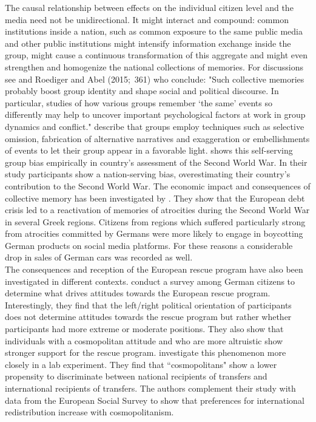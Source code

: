 The causal relationship between effects on the individual citizen level and
the media need not be unidirectional. It might interact and compound: common
institutions inside a nation, such as common exposure to the same public
media and other public institutions might intensify information exchange
inside the group, might cause a continuous transformation of this aggregate
and might even strengthen and homogenize the national collections of
memories. For discussions see \cite{rigney} and Roediger and Abel (2015;\
361) who conclude: "Such collective memories probably boost group identity
and shape social and political discourse. In particular, studies of how
various groups remember `the same' events so differently may help to uncover
important psychological factors at work in group dynamics and conflict." \cite{baumeister} describe that groups employ techniques such as selective omission, fabrication of alternative narratives and exaggeration or embellishments of events to let their group appear in a favorable light. \cite{abel} shows this self-serving group bias empirically in country's assessment of the Second World War. In their study participants show a nation-serving bias, overestimating their country's contribution to the Second World War. The economic impact and consequences of collective memory has been investigated by \cite{fouka}. They show that the European debt crisis led to a reactivation of memories of atrocities during the Second World War in several Greek regions. Citizens from regions which suffered particularly strong from atrocities committed by Germans were more likely to engage in boycotting German products on social media platforms. For these reasons a considerable drop in sales of German cars was recorded as well.  
\\

The consequences and reception of the European rescue program have also been investigated in different contexts. \cite{bechtel} conduct a survey among German citizens to determine what drives attitudes towards the European rescue program. Interestingly, they find that the left/right political orientation of participants does not determine attitudes towards the rescue program but rather whether participants had more extreme or moderate positions. They also show that individuals with a cosmopolitan attitude and who are more altruistic show stronger support for the rescue program. \cite{kuhn} investigate this phenomenon more closely in a lab experiment. They find that ``cosmopolitans" show a lower propensity to discriminate between national recipients of transfers and international recipients of transfers. The authors complement their study with data from the European Social Survey to show that preferences for international redistribution increase with cosmopolitanism.
\\

